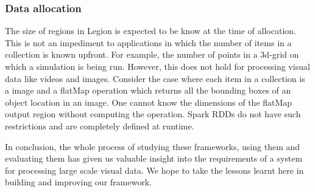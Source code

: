 \documentclass[tog]{acmsiggraph}
\begin{document}
\subsubsection{Data allocation}
The size of regions in Legion is expected to be know at the time of allocation.
This is not an impediment to applications in which the number of items in a
collection is known upfront. For example, the number of points in a 3d-grid on
which a simulation is being run. However, this does not hold for processing
visual data like videos and images. Consider the case where each item in a
collection is a image and a flatMap operation which returns all the bounding
boxes of an object location in an image. One cannot know the dimensions of the
flatMap output region without computing the operation. Spark RDDs do not have
such restrictions and are completely defined at runtime.

In conclusion, the whole process of studying these frameworks, using them and
evaluating them has given us valuable insight into the requirements of a system
for processing large scale visual data. We hope to take the lessons learnt here
in building and improving our framework.


\nocite{*}

\end{document}
